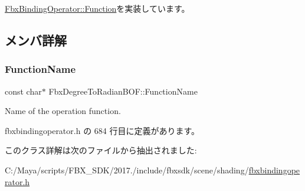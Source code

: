 \hyperlink{class_fbx_binding_operator_1_1_function_a9bbeec993a6e453a6569e7f40a85fd52}{Fbx\+Binding\+Operator\+::\+Function}を実装しています。



\subsection{メンバ詳解}
\mbox{\label{class_fbx_degree_to_radian_b_o_f_a5a082cbbb422d50fdc37dabab272caba}} 
\subsubsection{\texorpdfstring{Function\+Name}{FunctionName}}
{\footnotesize\ttfamily const char$\ast$ Fbx\+Degree\+To\+Radian\+B\+O\+F\+::\+Function\+Name\hspace{0.3cm}{\ttfamily [static]}}



Name of the operation function. 



 fbxbindingoperator.\+h の 684 行目に定義があります。



このクラス詳解は次のファイルから抽出されました\+:\begin{DoxyCompactItemize}
\item 
C\+:/\+Maya/scripts/\+F\+B\+X\+\_\+\+S\+D\+K/2017./include/fbxsdk/scene/shading/\hyperlink{fbxbindingoperator_8h}{fbxbindingoperator.\+h}\end{DoxyCompactItemize}
